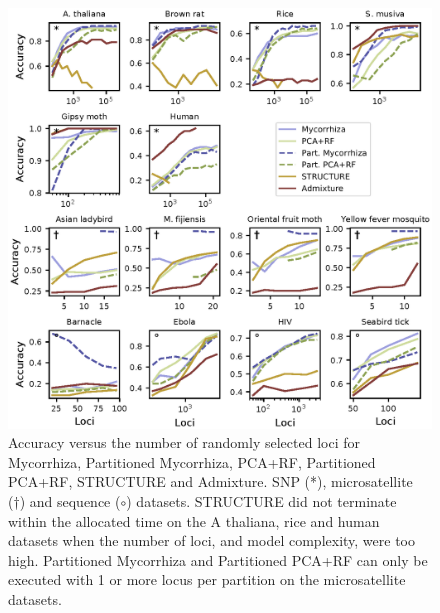 \documentclass{bioinfo}
\begin{document}
\begin{figure}[!tbp]%
    \includegraphics[width=\linewidth]{figure3.eps}
    \caption{Accuracy versus the number of randomly selected loci for Mycorrhiza, Partitioned Mycorrhiza, PCA+RF, Partitioned PCA+RF, STRUCTURE and Admixture. SNP (*), microsatellite (†) and sequence ($\circ$) datasets. STRUCTURE did not terminate within the allocated time on the A thaliana, rice and human datasets when the number of loci, and model complexity, were too high. Partitioned Mycorrhiza and Partitioned PCA+RF can only be executed with 1 or more locus per partition on the microsatellite datasets. }\label{fig:03}
\end{figure}
\end{document}
